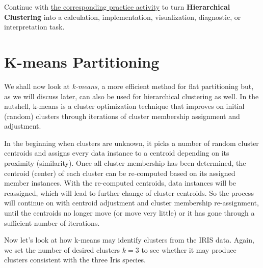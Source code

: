 \documentclass[
  letterpaper,
]{scrbook}
\begin{document}
\begin{tcolorbox}[enhanced jigsaw, arc=.35mm, bottomrule=.15mm, bottomtitle=1mm, breakable, colback=white, colbacktitle=quarto-callout-tip-color!10!white, colframe=quarto-callout-tip-color-frame, coltitle=black, left=2mm, leftrule=.75mm, opacityback=0, opacitybacktitle=0.6, rightrule=.15mm, title=\textcolor{quarto-callout-tip-color}{\faLightbulb}\hspace{0.5em}{Put it into practice}, titlerule=0mm, toprule=.15mm, toptitle=1mm]

Continue with \hyperref[sec-pr-10-hierarchical-clustering]{the
corresponding practice activity} to turn \textbf{Hierarchical
Clustering} into a calculation, implementation, visualization,
diagnostic, or interpretation task.

\end{tcolorbox}

\section{K-means Partitioning}\label{sect:org:kmeans}

We shall now look at \emph{k-means}, a more efficient method for flat
partitioning but, as we will discuss later, can also be used for
hierarchical clustering as well. In the nutshell, k-means is a cluster
optimization technique that improves on initial (random) clusters
through iterations of cluster membership assignment and adjustment.

In the beginning when clusters are unknown, it picks a number of random
cluster centroids and assigns every data instance to a centroid
depending on its proximity (similarity). Once all cluster membership has
been determined, the centroid (center) of each cluster can be
re-computed based on its assigned member instances. With the re-computed
centroids, data instances will be reassigned, which will lead to further
change of cluster centroids. So the process will continue on with
centroid adjustment and cluster membership re-assignment, until the
centroids no longer move (or move very little) or it has gone through a
sufficient number of iterations.

Now let's look at how k-means may identify clusters from the IRIS data.
Again, we set the number of desired clusters \(k=3\) to see whether it
may produce clusters consistent with the three Iris species.
\end{document}
